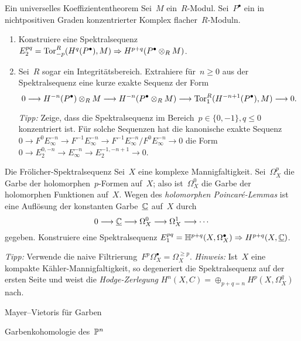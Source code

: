 \documentclass{uebblatt}
\begin{document}

\begin{aufgabe}{Ein universelles Koeffiziententheorem}
Sei~$M$ ein~$R$-Modul. Sei~$P^\bullet$ ein in nichtpositiven Graden
konzentrierter Komplex flacher~$R$-Moduln.
\begin{enumerate}
\item Konstruiere eine Spektralsequenz $E_2^{pq} =
\mathrm{Tor}_{-p}^R(H^q(P^\bullet),M) \Rightarrow H^{p+q}(P^\bullet \otimes_R M)$.
\item Sei~$R$ sogar ein Integritätsbereich. Extrahiere für~$n \geq 0$ aus der
Spektralsequenz eine kurze exakte Sequenz der Form
\[ 0 \longrightarrow H^{-n}(P^\bullet) \otimes_R M \longrightarrow H^{-n}(P^\bullet \otimes_R M)
  \longrightarrow \mathrm{Tor}_1^R(H^{-n+1}(P^\bullet), M) \longrightarrow 0. \]
{\tiny\emph{Tipp:} Zeige, dass die Spektralsequenz im Bereich~$p \in \{ 0,-1
\}, q \leq 0$ konzentriert ist. Für solche Sequenzen hat die
kanonische exakte Sequenz $0 \to F^0 E_\infty^{-n} \to F^{-1}
E_\infty^{-n} \to F^{-1} E_\infty^{-n} / F^0 E_\infty^{-n} \to 0$ die Form
$0 \to E_2^{0,-n} \to E_\infty^{-n} \to E_2^{-1,-n+1} \to 0$.\par}
\end{enumerate}
\end{aufgabe}

\begin{aufgabe}{Die Frölicher-Spektralsequenz}
Sei~$X$ eine komplexe Mannigfaltigkeit. Sei~$\Omega_X^p$ die Garbe der
holomorphen~$p$-Formen auf~$X$; also ist~$\Omega_X^0$ die Garbe der holomorphen
Funktionen auf~$X$. Wegen des \emph{holomorphen Poincaré-Lemmas} ist eine
Auflösung der konstanten Garbe~$\underline{\mathbb{C}}$ auf~$X$ durch
\[ 0 \longrightarrow \underline{\mathbb{C}} \longrightarrow \Omega_X^0 \longrightarrow \Omega_X^1 \longrightarrow \cdots \]
gegeben. Konstruiere eine Spektralsequenz $E_1^{pq} = \mathbb{H}^{p+q}(X,
\Omega_X^\bullet) \Rightarrow H^{p+q}(X,\underline{\mathbb{C}})$.

{\tiny\emph{Tipp:} Verwende die naive Filtrierung~$F^p \Omega_X^\bullet =
\Omega_X^{\geq p}$. \emph{Hinweis:} Ist~$X$ eine kompakte
Kähler-Mannigfaltigkeit, so degeneriert die Spektralsequenz auf der ersten
Seite und weist die \emph{Hodge-Zerlegung} $H^n(X,C) = \oplus_{p+q=n}
H^p(X,\Omega_X^q)$ nach.\par}
\end{aufgabe}

Mayer--Vietoris für Garben

Garbenkohomologie des~$\mathbb{P}^n$
\end{document}
